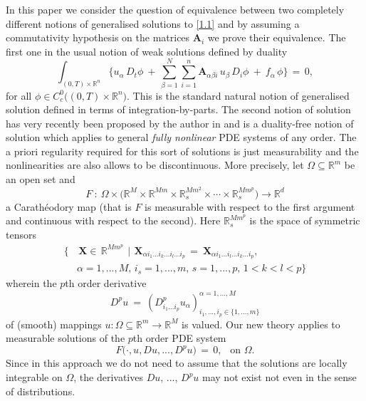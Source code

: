 \documentclass{amsart}
\theoremstyle{definition}
\numberwithin{equation}{section}
\begin{document}
In this paper we consider the question of equivalence between two completely different notions of generalised solutions to \eqref{1.1} and by assuming a commutativity hypothesis on the matrices ${\textbf{A}}_i$ we prove their equivalence. The first one in the usual notion of weak solutions defined by duality
\[
\int_{(0,T){\times} {\mathbb{R}}^n} \Bigg\{ u_{\alpha} \,D_t \phi\ +\, \sum_{{\beta}=1}^N\sum_{i=1}^n{\textbf{A}}_{{\alpha} {\beta} i}\, u_{\beta}\,D_i \phi \ +\ f_{\alpha}\, \phi\Bigg\} \, =\, 0, 
\]
for all $\phi \in C^0_c\big((0,T)\!{\times}{\mathbb{R}}^n \big)$. This is the standard natural notion of generalised solution defined in terms of integration-by-parts. The second notion of solution has very recently been proposed by the author in \cite{K8,K9} and is a duality-free notion of solution which applies to general \emph{fully nonlinear} PDE systems of any order. The a priori regularity required for this sort of solutions is just measurability and the nonlinearities are also allows to be discontinuous. More precisely, let  ${\Omega}{\subseteq} {\mathbb{R}}^m$ be an open set and
\begin{equation}   \label{1.4}
F\ : \ {\Omega} {\times} \Big({\mathbb{R}}^M{\times} {\mathbb{R}}^{Mm}{\times} {\mathbb{R}}^{Mm^2}_s {\times} \cdots {\times} {\mathbb{R}}^{Mm^p}_s \Big) {\longrightarrow} {\mathbb{R}}^d
\end{equation}
a Carath\'eodory map (that is $F$ is measurable with respect to the first argument and continuous with respect to the second). Here ${\mathbb{R}}^{Mm^p}_s$ is the space of symmetric tensors 
\[
\begin{split}
 \Big\{ & \,  {\textbf{X}}  \in  \, {\mathbb{R}}^{Mm^p} \ \, \big| \ \, {\textbf{X}}_{{\alpha} i_1 ...i_k... i_l ... i_p} \, =\ {\textbf{X}}_{{\alpha}  i_1 ...i_l... i_k ... i_p} ,
\\ 
& {\alpha} =1,...,M,  \, i_s =1,...,m,\, s=1,...,p,\, 1<k<l<p\Big\}
 \end{split}
\]
wherein the $p$th order derivative 
\[
D^p u\ =\ \left( D^p_{i_1 ... i_p}u_{\alpha}\right)_{i_1,...,i_p \in \{1,...,m\}}^{{\alpha}=1,...,M}
\]
of (smooth) mappings $u:{\Omega} {\subseteq} {\mathbb{R}}^m {\longrightarrow} {\mathbb{R}}^M$ is valued. Our new theory applies to measurable solutions of the $p$th order PDE system
\begin{equation}  \label{1.5}
F\big(\cdot,u,Du,...,D^pu\big)\, =\, 0,\ \  \text{ on }{\Omega}.
\end{equation}
Since in this approach we do not need to assume that the solutions are locally integrable on ${\Omega}$, the derivatives $Du$, ..., $D^pu$ may not exist not even in the sense of distributions.
\end{document}
